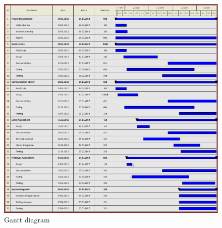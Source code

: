 \begin{figure}[h!]
	\centering \includegraphics[scale=.6]{img/mgmt-gantt.png}
	\caption{Gantt diagram}
	\label{fig:design-toplevel}
\end{figure}



